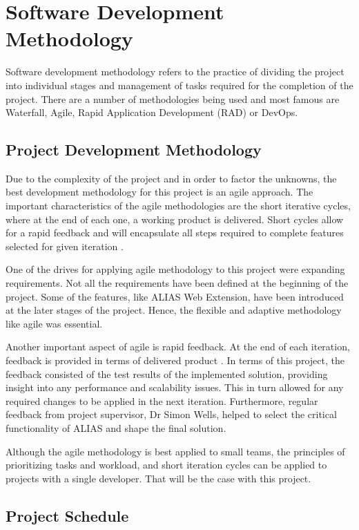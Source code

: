 \section{Software Development Methodology}
Software development methodology refers to the practice of dividing the project into individual stages and management of tasks required for the completion of the project. There are a number of methodologies being used and most famous are Waterfall, Agile, Rapid Application Development (RAD) or DevOps. 

\subsection{Project Development Methodology}
Due to the complexity of the project and in order to factor the unknowns, the best development methodology for this project is an agile approach. The important characteristics of the agile methodologies are the short iterative cycles, where at the end of each one, a working product is delivered. Short cycles allow for a rapid feedback and will encapsulate all steps required to complete features selected for given iteration \citep{agile1}.

One of the drives for applying agile methodology to this project were expanding requirements. Not all the requirements have been defined at the beginning of the project. Some of the features, like ALIAS Web Extension, have been introduced at the later stages of the project. Hence, the flexible and adaptive methodology like agile was essential. 

Another important aspect of agile is rapid feedback. At the end of each iteration, feedback is provided in terms of delivered product \citep{agilebook}. In terms of this project, the feedback consisted of the test results of the implemented solution, providing insight into any performance and scalability issues. This in turn allowed for any required changes to be applied in the next iteration. Furthermore, regular feedback from project supervisor, Dr Simon Wells, helped to select the critical functionality of ALIAS and shape the final solution.

Although the agile methodology is best applied to small teams, the principles of prioritizing tasks and workload, and short iteration cycles can be applied to projects with a single developer. That will be the case with this project. 

\subsection{Project Schedule}

